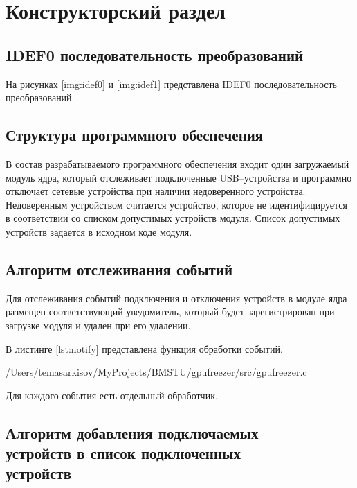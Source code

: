 \chapter{Конструкторский раздел}

\section{IDEF0 последовательность преобразований}

На рисунках \ref{img:idef0} и \ref{img:idef1} представлена IDEF0 последовательность преобразований.



\section{Структура программного обеспечения}

В состав разрабатываемого программного обеспечения входит один загружаемый модуль ядра, который отслеживает подключенные USB--устройства и программно отключает сетевые устройства при наличии недоверенного устройства. Недоверенным устройством считается устройство, которое не идентифицируется в соответствии со списком допустимых устройств модуля. Список допустимых устройств задается в исходном коде модуля.

\section{Алгоритм отслеживания событий}

Для отслеживания событий подключения и отключения устройств в модуле ядра размещен соответствующий уведомитель, который будет зарегистрирован при загрузке модуля и удален при его удалении.

В листинге \ref{lst:notify} представлена функция обработки событий.

\begin{lstinputlisting}[
	caption={Обработка событий},
	label={lst:notify},
	style={c},
	linerange={180-202},
	]{/Users/temasarkisov/MyProjects/BMSTU/gpufreezer/src/gpufreezer.c}
\end{lstinputlisting}

Для каждого события есть отдельный обработчик.

\section{Алгоритм добавления подключаемых \\устройств в список подключенных\\ устройств}

